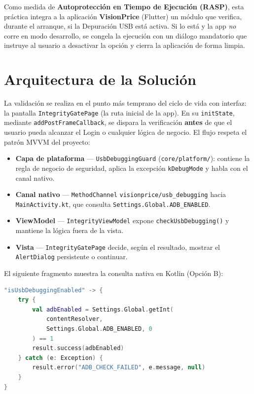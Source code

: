 \documentclass[12pt, a4paper]{article}
\begin{document}
Como medida de \textbf{Autoprotección en Tiempo de Ejecución (RASP)}, esta
práctica integra a la aplicación \textbf{VisionPrice} (Flutter) un módulo que
verifica, durante el arranque, si la Depuración USB está activa. Si lo está y
la app \textit{no} corre en modo desarrollo, se congela la ejecución con un
diálogo mandatorio que instruye al usuario a desactivar la opción y cierra la
aplicación de forma limpia.

\section{Arquitectura de la Solución}
\label{sec:arquitectura}
La validación se realiza en el punto más temprano del ciclo de vida con
interfaz: la pantalla \texttt{IntegrityGatePage} (la ruta inicial de la app).
En su \texttt{initState}, mediante \texttt{addPostFrameCallback}, se dispara la
verificación \textbf{antes} de que el usuario pueda alcanzar el Login o
cualquier lógica de negocio. El flujo respeta el patrón MVVM del proyecto:

\begin{itemize}\itemsep2pt
    \item \textbf{Capa de plataforma} — \texttt{UsbDebuggingGuard}
    (\texttt{core/platform/}): contiene la regla de negocio de seguridad,
    aplica la excepción \texttt{kDebugMode} y habla con el canal nativo.
    \item \textbf{Canal nativo} — \texttt{MethodChannel}
    \texttt{visionprice/usb\_debugging} hacia \texttt{MainActivity.kt}, que
    consulta \texttt{Settings.Global.ADB\_ENABLED}.
    \item \textbf{ViewModel} — \texttt{IntegrityViewModel} expone
    \texttt{checkUsbDebugging()} y mantiene la lógica fuera de la vista.
    \item \textbf{Vista} — \texttt{IntegrityGatePage} decide, según el
    resultado, mostrar el \texttt{AlertDialog} persistente o continuar.
\end{itemize}

El siguiente fragmento muestra la consulta nativa en Kotlin (Opción B):

\begin{lstlisting}[language=Kotlin, caption={MainActivity.kt — lectura de ADB\_ENABLED}]
"isUsbDebuggingEnabled" -> {
    try {
        val adbEnabled = Settings.Global.getInt(
            contentResolver,
            Settings.Global.ADB_ENABLED, 0
        ) == 1
        result.success(adbEnabled)
    } catch (e: Exception) {
        result.error("ADB_CHECK_FAILED", e.message, null)
    }
}
\end{lstlisting}
\end{document}
